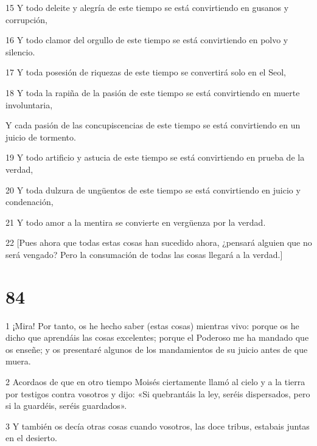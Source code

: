 \par 15 Y todo deleite y alegría de este tiempo se está convirtiendo en gusanos y corrupción,

\par 16 Y todo clamor del orgullo de este tiempo se está convirtiendo en polvo y silencio.

\par 17 Y toda posesión de riquezas de este tiempo se convertirá solo en el Seol,

\par 18 Y toda la rapiña de la pasión de este tiempo se está convirtiendo en muerte involuntaria,

\par Y cada pasión de las concupiscencias de este tiempo se está convirtiendo en un juicio de tormento.

\par 19 Y todo artificio y astucia de este tiempo se está convirtiendo en prueba de la verdad,

\par 20 Y toda dulzura de ungüentos de este tiempo se está convirtiendo en juicio y condenación,

\par 21 Y todo amor a la mentira se convierte en vergüenza por la verdad.

\par 22 [Pues ahora que todas estas cosas han sucedido ahora, ¿pensará alguien que no será vengado? Pero la consumación de todas las cosas llegará a la verdad.]

\chapter{84}

\par 1 ¡Mira! Por tanto, os he hecho saber (estas cosas) mientras vivo: porque os he dicho que aprendáis las cosas excelentes; porque el Poderoso me ha mandado que os enseñe; y os presentaré algunos de los mandamientos de su juicio antes de que muera.

\par 2 Acordaos de que en otro tiempo Moisés ciertamente llamó al cielo y a la tierra por testigos contra vosotros y dijo: «Si quebrantáis la ley, seréis dispersados, pero si la guardéis, seréis guardados».

\par 3 Y también os decía otras cosas cuando vosotros, las doce tribus, estabais juntas en el desierto.

